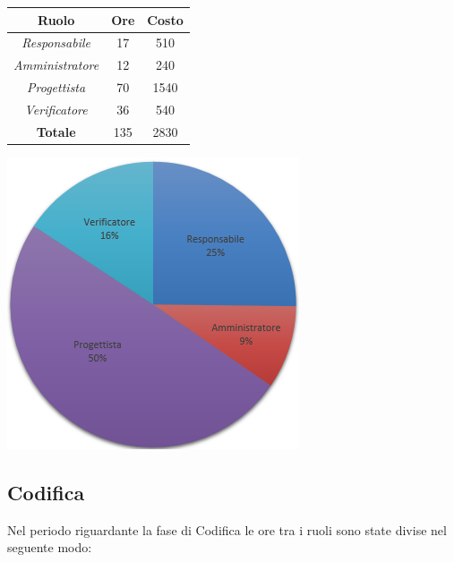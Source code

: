 \begin{center}
  \centering
  \begin{tabular}{|c|c|c|}
    \hline
    \textbf{Ruolo} & \textbf{Ore} & \textbf{Costo} \\
    \hline
     \emph{Responsabile}  & 17 & 510 \\
    \hline  \emph{Amministratore}  & 12 & 240 \\
    \hline  \emph{Progettista}  & 70 & 1540 \\
    \hline  \emph{Verificatore}  & 36 & 540 \\
    \hline
    \textbf{Totale} & 135 & 2830 \\
    \hline
  \end{tabular}
  \includegraphics[scale=0.7]{img/3-ProgArchitetturale.png}
\end{center}

\subsection{Codifica}
Nel periodo riguardante la fase di Codifica le ore tra i ruoli sono state divise nel seguente modo: \\ \\

